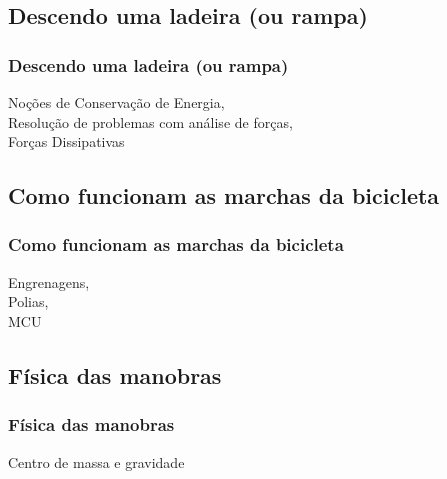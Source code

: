 \documentclass{beamer}
\begin{document}
	\begin{frame}
		\section{Descendo uma ladeira (ou rampa)}
		\frametitle{Descendo uma ladeira (ou rampa)}
		Noções de Conservação de Energia, \\
		Resolução de problemas com análise de forças, \\
		Forças Dissipativas
	\end{frame}

	\begin{frame}
		\section{Como funcionam as marchas da bicicleta}
		\frametitle{Como funcionam as marchas da bicicleta}
		Engrenagens, \\
		Polias, \\
		MCU
	\end{frame}

	\begin{frame}
		\section{Física das manobras}
		\frametitle{Física das manobras}
		Centro de massa e gravidade
	\end{frame}
\end{document}
